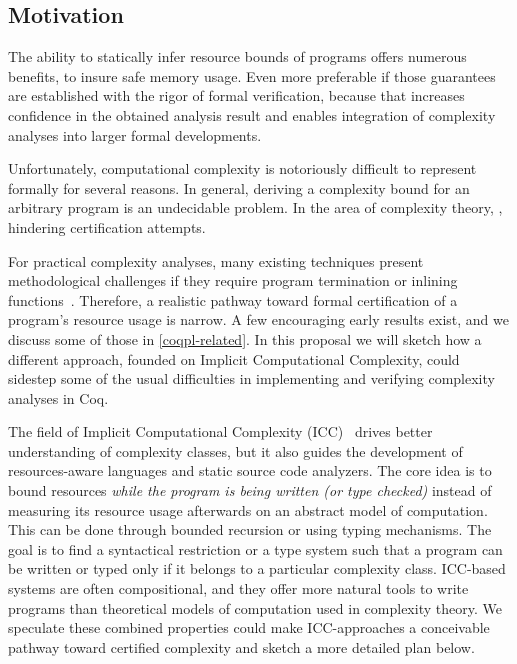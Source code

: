 \subsection{Motivation}\label{coqpl-motivation}

The ability to statically infer resource bounds of programs offers numerous benefits, \eg to insure safe memory usage.
Even more preferable if those guarantees are established with the rigor of formal verification,
because that increases confidence in the obtained analysis result and enables integration of complexity
analyses into larger formal developments.

Unfortunately, computational complexity is notoriously difficult to represent formally for several reasons.
In general, deriving a complexity bound for an arbitrary program is an undecidable problem.
In the area of complexity theory, , hindering certification attempts.

For practical complexity analyses, many existing techniques present methodological challenges if they require
\eg program termination or inlining functions~\cite{carbonneaux2015}.
Therefore, a realistic pathway toward formal certification of a program's resource usage is narrow.
A few encouraging early results exist, and we discuss some of those in \autoref{coqpl-related}.
In this proposal we will sketch how a different approach, founded on Implicit Computational Complexity,
could sidestep some of the usual difficulties in implementing and verifying complexity analyses in Coq.

The field of Implicit Computational Complexity (ICC)~\cite{dallago2011} drives better understanding of complexity classes, but it also guides the development of resources-aware languages and static source code analyzers.
The core idea is to bound resources \emph{while the program is being written (or type checked)} instead of measuring its resource usage afterwards on an abstract model of computation.
This can be done through \eg bounded recursion or using typing mechanisms.
The goal is to find a syntactical restriction or a type system such that a program can be written or typed only if it belongs to a particular complexity class.
ICC-based systems are often compositional, and they offer more natural tools to write programs than theoretical models of computation used in complexity theory.
We speculate these combined properties could make ICC-approaches a conceivable pathway toward certified complexity and sketch a more detailed plan below.

